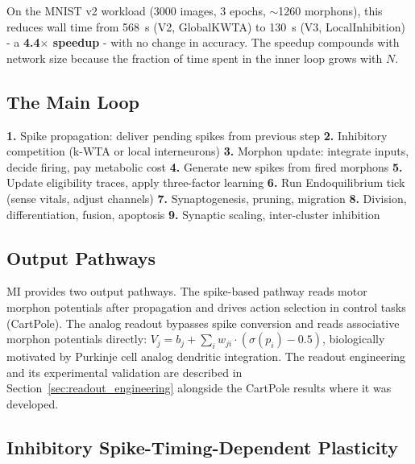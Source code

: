 On the MNIST v2 workload (3000 images, 3 epochs, $\sim$1260 morphons), this reduces wall time from 568~s (V2, GlobalKWTA) to 130~s (V3, LocalInhibition) - a \textbf{4.4$\times$ speedup} - with no change in accuracy. The speedup compounds with network size because the fraction of time spent in the inner loop grows with $N$.

\subsection{The Main Loop}

\begin{algorithm}
\caption{System::step (one fast tick)}
\label{alg:step}
\begin{algorithmic}[1]
\State \textbf{1.} Spike propagation: deliver pending spikes from previous step
\State \textbf{2.} Inhibitory competition (k-WTA or local interneurons)
\State \textbf{3.} Morphon update: integrate inputs, decide firing, pay metabolic cost
\State \textbf{4.} Generate new spikes from fired morphons
  \State \textbf{5.} Update eligibility traces, apply three-factor learning
  \State \textbf{6.} Run Endoquilibrium tick (sense vitals, adjust channels)
\EndIf
{}
  \State \textbf{7.} Synaptogenesis, pruning, migration
\EndIf
{}
  \State \textbf{8.} Division, differentiation, fusion, apoptosis
\EndIf
{}
  \State \textbf{9.} Synaptic scaling, inter-cluster inhibition
\EndIf
\end{algorithmic}
\end{algorithm}

\subsection{Output Pathways}
\label{sec:output_pathways}

MI provides two output pathways. The spike-based pathway reads motor morphon potentials after propagation and drives action selection in control tasks (CartPole). The analog readout bypasses spike conversion and reads associative morphon potentials directly: $V_j = b_j + \sum_i w_{ji} \cdot (\sigma(p_i) - 0.5)$, biologically motivated by Purkinje cell analog dendritic integration. The readout engineering and its experimental validation are described in Section~\ref{sec:readout_engineering} alongside the CartPole results where it was developed.

\subsection{Inhibitory Spike-Timing-Dependent Plasticity}
\label{sec:istdp}

